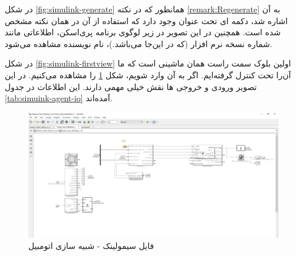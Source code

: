 در شکل 
\ref{fig:simulink-generate}
همانطور که در نکته
\ref{remark:Regenerate} 
به آن اشاره شد، دکمه ای تحت عنوان 
وجود دارد که استفاده از آن در همان نکته مشخص شده است. همچنین در این تصویر در زیر لوگوی برنامه پری‌اسکن، اطلاعاتی مانند شماره نسخه نرم افزار (که در این‌جا  می‌باشد.)، نام نویسنده مشاهده می‌شود.

در شکل 
\ref{fig:simulink-firstview}
اولین بلوک سمت راست همان ماشینی است که ما آن‌را تحت کنترل گرفته‌ایم. اگر به آن وارد شویم، شکل 
\ref{fig:simulink-agent}
را مشاهده می‌کنیم.
در این تصویر ورودی و خروجی ها نقش خیلی مهمی دارند. این اطلاعات در جدول
\ref{tab:simuink-agent-io}
آمده‌اند.



\begin{figure}[h!]
	\centering
	\includegraphics[width=1\linewidth]{Figures/simulink/agent}
	\caption{فایل سیمولینک - شبیه سازی اتومبیل}
	\label{fig:simulink-agent}
\end{figure}


